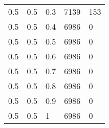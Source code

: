 \begin{table}[ht]
\begin{tabular}{ | l | l | l | l | l |}
		0.5      & 0.5     & 0.3 & 7139      & 153     \\
		0.5      & 0.5     & 0.4 & 6986      & 0       \\
		0.5      & 0.5     & 0.5 & 6986      & 0       \\
		0.5      & 0.5     & 0.6 & 6986      & 0       \\
		0.5      & 0.5     & 0.7 & 6986      & 0       \\
		0.5      & 0.5     & 0.8 & 6986      & 0       \\
		0.5      & 0.5     & 0.9 & 6986      & 0       \\
		0.5      & 0.5     & 1   & 6986      & 0       \\

		\hline
	\end{tabular}
\end{table}


